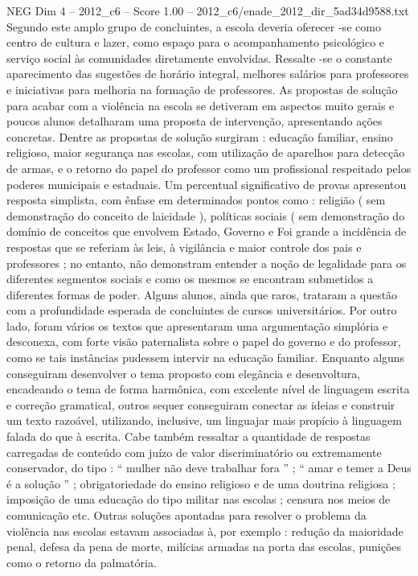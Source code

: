 \begin{textsample}{NEG Dim 4 – 2012\_c6 – Score 1.00 – 2012\_c6/enade\_2012\_dir\_5ad34d9588.txt}
Segundo este amplo grupo de concluintes, a escola deveria oferecer -se como centro de cultura e lazer, como espaço para o acompanhamento psicológico e serviço social às comunidades diretamente envolvidas.
Ressalte -se o constante aparecimento das sugestões de horário integral, melhores salários para professores e iniciativas para melhoria na formação de professores.
As propostas de solução para acabar com a violência na escola se detiveram em aspectos muito gerais e poucos alunos detalharam uma proposta de intervenção, apresentando ações concretas.
Dentre as propostas de solução surgiram : educação familiar, ensino religioso, maior segurança nas escolas, com utilização de aparelhos para detecção de armas, e o retorno do papel do professor como um profissional respeitado pelos poderes municipais e estaduais.
Um percentual significativo de provas apresentou resposta simplista, com ênfase em determinados pontos como : religião ( sem demonstração do conceito de laicidade ), políticas sociais ( sem demonstração do domínio de conceitos que envolvem Estado, Governo e Foi grande a incidência de respostas que se referiam às leis, à vigilância e maior controle dos pais e professores ; no entanto, não demonstram entender a noção de legalidade para os diferentes segmentos sociais e como os mesmos se encontram submetidos a diferentes formas de poder.
Alguns alunos, ainda que raros, trataram a questão com a profundidade esperada de concluintes de cursos universitários.
Por outro lado, foram vários os textos que apresentaram uma argumentação simplória e desconexa, com forte visão paternalista sobre o papel do governo e do professor, como se tais instâncias pudessem intervir na educação familiar.
Enquanto alguns conseguiram desenvolver o tema proposto com elegância e desenvoltura, encadeando o tema de forma harmônica, com excelente nível de linguagem escrita e correção gramatical, outros sequer conseguiram conectar as ideias e construir um texto razoável, utilizando, inclusive, um linguajar mais propício à linguagem falada do que à escrita.
Cabe também ressaltar a quantidade de respostas carregadas de conteúdo com juízo de valor discriminatório ou extremamente conservador, do tipo : “ mulher não deve trabalhar fora ” ; “ amar e temer a Deus é a solução ” ; obrigatoriedade do ensino religioso e de uma doutrina religiosa ; imposição de uma educação do tipo militar nas escolas ; censura nos meios de comunicação etc.
Outras soluções apontadas para resolver o problema da violência nas escolas estavam associadas à, por exemplo : redução da maioridade penal, defesa da pena de morte, milícias armadas na porta das escolas, punições como o retorno da palmatória.

\end{textsample}
